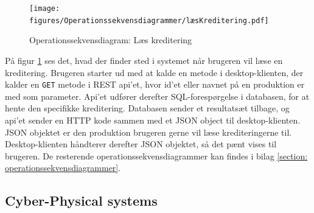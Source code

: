 \begin{figure}[H] %
\centering
\texttt{[image: figures/Operationssekvensdiagrammer/læsKreditering.pdf]}
\caption{Operationssekvensdiagram: Læs kreditering}
\label{fig:op_read_credit}
\end{figure}


På figur \ref{fig:op_read_credit} ses det, hvad der finder sted i systemet når brugeren vil læse en kreditering. Brugeren starter ud med at kalde en metode i desktop-klienten, der kalder en \texttt{GET} metode i REST api'et, hvor id'et eller navnet på en produktion er med som parameter. Api'et udfører derefter SQL-forespørgelse i databasen, for at hente den specifikke kreditering. Databasen sender et resultatsæt tilbage, og api'et sender en HTTP kode sammen med et JSON object til desktop-klienten. JSON objektet er den produktion brugeren gerne vil læse krediteringerne til. Desktop-klienten håndterer derefter JSON objektet, så det pænt vises til brugeren. De resterende operationssekvensdiagrammer kan findes i bilag \ref{section: operationssekvensdiagrammer}.


\subsection{Cyber-Physical systems}
